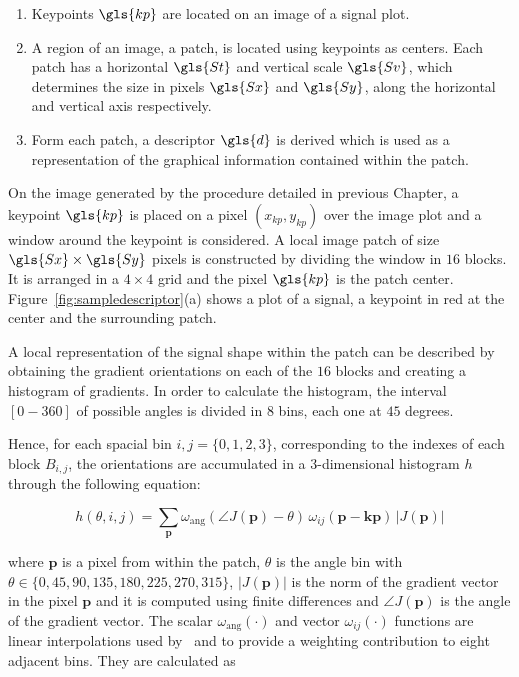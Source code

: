 \begin{enumerate}
\item Keypoints $\gls{kp}$ are located on an image of a signal plot.
\item A region of an image, a patch, is located using keypoints as centers.  Each patch has a horizontal $\gls{St}$ and vertical scale $\gls{Sv}$, which determines the size in pixels $\gls{Sx}$ and $\gls{Sy}$,  along the horizontal and vertical axis respectively. 
\item Form each patch, a descriptor $\gls{d}$ is derived which is used as a representation of the graphical information contained within the patch.
\end{enumerate}

On the image generated by the procedure detailed in previous Chapter, a keypoint $\gls{kp}$ is placed on a pixel $(x_{kp}, y_{kp})$ over the image plot and a window around the keypoint is considered. A local image patch of size $\gls{Sx} \times \gls{Sy}$ pixels is constructed by dividing the window in $16$ blocks. It is arranged in a $4 \times 4$ grid and the pixel $\gls{kp}$ is the patch center.  Figure~\ref{fig:sampledescriptor}(a) shows a plot of a signal, a keypoint in red at the center and the surrounding patch.


A local representation of the signal shape within the patch can be described by obtaining the gradient orientations on each of the $16$ blocks and creating a histogram of gradients.  In order to calculate the histogram, the interval $[0-360]$ of possible angles is divided in $8$ bins, each one at $45$ degrees.

Hence, for each spacial bin $ i,j = \{0,1,2,3\} $, corresponding to the indexes of each block $B_{i,j}$,  the orientations are accumulated in a  $3$-dimensional histogram $h$ through the following equation: 
 

\begin{equation}
 h(\theta,i,j) = \sum_{\mathbf{p}} \omega_\mathrm{ang}(\angle J(\mathbf{p}) - \theta)\, \omega_{ij}\left(\mathbf{p} - \mathbf{kp} \right)\, |J(\mathbf{p})|
\label{eq:histogram}
\end{equation}

\noindent  where $\mathbf{p}$ is a pixel from within the patch,  $\theta$ is the angle bin with $ \theta \in \{0, 45, 90, 135, 180, 225, 270, 315\} $,  $ |J(\mathbf{p})| $ is the norm of the gradient vector in the pixel $\mathbf{p}$ and it is computed using finite differences and $\angle J(\mathbf{p}) $ is the angle of the gradient vector.  The scalar $ \omega_\mathrm{ang}(\cdot) $  and vector $ \omega_{ij}(\cdot) $ functions are linear interpolations used by~\cite{Lowe2004} and \cite{Vedaldi2010} to provide a weighting contribution to eight adjacent bins.  They are calculated as  

